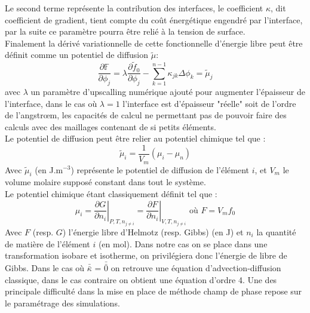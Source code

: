 \documentclass[a4paper,11pt,fleqn]{report}    %
\newcommand{\doubleoverline}[1]{\bar{\bar{#1}}} 			%
\begin{document}
Le second terme représente la contribution des interfaces, le coefficient $\kappa$, dit coefficient de gradient, tient compte du coût énergétique engendré par l'interface, par la suite ce paramètre pourra être relié à la tension de surface. \\
Finalement la dérivé variationnelle de cette fonctionnelle d'énergie libre peut être définit comme un potentiel de diffusion $\tilde{\mu}$: 
\begin{equation}\label{eq_potentiel}
	\frac{\partial \mathbb{F}}{\partial \phi_j} =\lambda \frac{\partial \tilde{f}_0}{\partial \phi_j} -\sum_{k=1}^{n-1} \kappa_{jk} \Delta \phi_k = \tilde{\mu}_j
\end{equation}
avec $\lambda$ un paramètre d'upscalling numérique ajouté pour augmenter l'épaisseur de l'interface, dans le cas où $\lambda=1$ l'interface est d'épaisseur "réelle" soit de l'ordre de l'angstr\oe m, les capacités de calcul ne permettant pas de pouvoir faire des calculs avec des maillages contenant de si petits éléments. \\
Le potentiel de diffusion peut être relier au potentiel chimique tel que :
\begin{equation}
	\tilde{\mu}_i = \frac{1}{V_m}\left(\mu_i - \mu_n\right)
\end{equation}
Avec $\tilde{\mu}_i$ (en J.m$^{-3}$) représente le potentiel de diffusion de l'élément $i$, et $V_m$ le volume molaire supposé constant dans tout le système.\\
Le potentiel chimique étant classiquement définit tel que :
\begin{equation}
	\mu_i = \left.\frac{\partial G}{\partial n_i}\right|_{P,T,n_{j\neq i }} = \left.\frac{\partial F}{\partial n_i}\right|_{V,T,n_{j\neq i }}
	  \textrm{                        où           } F = V_m f_0
\end{equation}
Avec $F$ (resp. $G$) l'énergie libre d'Helmotz (resp. Gibbs) (en J) et $n_i$ la quantité de matière de l'élément $i$ (en mol). Dans notre cas on se place dans une transformation isobare et isotherme, on privilégiera donc l'énergie de libre de Gibbs.
Dans le cas où $\doubleoverline{\kappa}$ = $\doubleoverline{0}$ on retrouve une équation d'advection-diffusion classique, dans le cas contraire on obtient une équation d'ordre 4. Une des principale difficulté dans la mise en place de méthode champ de phase repose sur le paramétrage des simulations.
\end{document}
